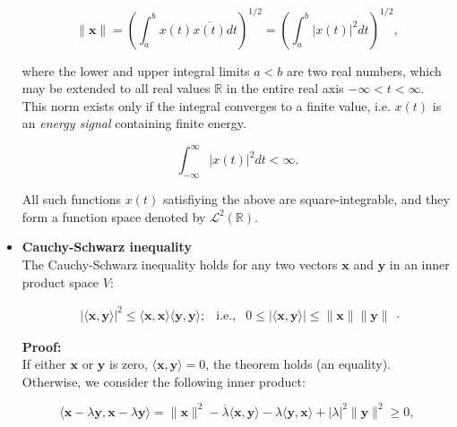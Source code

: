 \documentclass[10pt,b5paper,titlepage]{book}
\begin{document}
\begin{itemize}
        \begin{equation}
            \|\mathbf{x}\|
            = \left( \int_{a}^{b} x(t) \overline{x(t)} dt  \right)^{1 / 2}
            = \left( \int_{a}^{b} |x(t)|^{2} dt  \right)^{1 / 2}
        ,\end{equation}

        where the lower and upper integral limits $a < b$ are two real
        numbers, which may be extended to all real values  $\mathbb{R}$
        in the entire real axis $-\infty < t < \infty$. This norm exists
        only if the integral converges to a finite value, i.e. $x(t)$
        is an  \textit{energy signal} containing finite energy.

        \begin{equation}
            \int_{-\infty}^{\infty} |x(t)|^{2} dt < \infty
        .\end{equation}

        All such functions $x(t)$ satisfiying the above are square-integrable,
        and they form a function space denoted by $\mathcal{L}^{2}(\mathbb{R})$.

    \item \textbf{Cauchy-Schwarz inequality}\\

        The Cauchy-Schwarz inequality holds for any two vectors $\mathbf{x}$
        and $\mathbf{y}$ in an inner product space $V$:

        \begin{equation}
            \begin{array}{lcr}
                | \langle \mathbf{x}, \mathbf{y} \rangle |^{2}
                \le \langle \mathbf{x}, \mathbf{x} \rangle
                \langle \mathbf{y}, \mathbf{y} \rangle; &
                \text{i.e.,} &
                0 \le  | \langle \mathbf{x}, \mathbf{y} \rangle |
                \le \|\mathbf{x}\| \|\mathbf{y}\|
            \end{array}
        .\end{equation}

        \textbf{Proof:}\\

        If either $\mathbf{x}$ or $\mathbf{y}$ is zero,
        $\langle \mathbf{x}, \mathbf{y} \rangle = 0$, the theorem holds
        (an equality). Otherwise, we consider the following inner product:

        \begin{equation}
            \langle \mathbf{x} - \lambda \mathbf{y}, \mathbf{x} - \lambda \mathbf{y} \rangle
            = \|\mathbf{x}\|^{2}
            - \overline{\lambda} \langle \mathbf{x}, \mathbf{y} \rangle
            - \lambda \langle \mathbf{y}, \mathbf{x} \rangle
            + |\lambda|^{2} \|\mathbf{y}\|^{2}
            \ge 0
        ,\end{equation}


\end{itemize}
\end{document}
